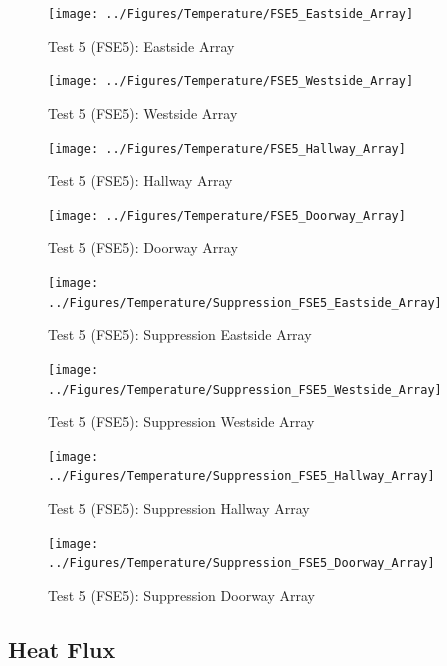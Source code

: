 \documentclass[12pt,oneside]{book}
\begin{document}
\begin{figure}[!ht]
	\texttt{[image: ../Figures/Temperature/FSE5\_Eastside\_Array]}
	\caption{Test 5 (FSE5): Eastside Array}
	\label{fig:Test_5_Eastside_Array}
\end{figure}

\begin{figure}[!ht]
	\texttt{[image: ../Figures/Temperature/FSE5\_Westside\_Array]}
	\caption{Test 5 (FSE5): Westside Array}
	\label{fig:Test_5_Westside_Array}
\end{figure}

\begin{figure}[!ht]
	\texttt{[image: ../Figures/Temperature/FSE5\_Hallway\_Array]}
	\caption{Test 5 (FSE5): Hallway Array}
	\label{fig:Test_5_Hallway_Array}
\end{figure}

\begin{figure}[!ht]
	\texttt{[image: ../Figures/Temperature/FSE5\_Doorway\_Array]}
	\caption{Test 5 (FSE5): Doorway Array}
	\label{fig:Test_5_Doorway_Array}
\end{figure}

\begin{figure}[!ht]
	\texttt{[image: ../Figures/Temperature/Suppression\_FSE5\_Eastside\_Array]}
	\caption{Test 5 (FSE5): Suppression Eastside Array}
	\label{fig:Test_5_Suppression_Eastside_Array}
\end{figure}

\begin{figure}[!ht]
	\texttt{[image: ../Figures/Temperature/Suppression\_FSE5\_Westside\_Array]}
	\caption{Test 5 (FSE5): Suppression Westside Array}
	\label{fig:Test_5_Suppression_Westside_Array}
\end{figure}

\begin{figure}[!ht]
	\texttt{[image: ../Figures/Temperature/Suppression\_FSE5\_Hallway\_Array]}
	\caption{Test 5 (FSE5): Suppression Hallway Array}
	\label{fig:Test_5_Suppression_Hallway_Array}
\end{figure}

\begin{figure}[!ht]
	\texttt{[image: ../Figures/Temperature/Suppression\_FSE5\_Doorway\_Array]}
	\caption{Test 5 (FSE5): Suppression Doorway Array}
	\label{fig:Test_5_Suppression_Doorway_Array}
\end{figure}

\subsection{Heat Flux}
\label{subsec:Heat_Flux}
\end{document}
